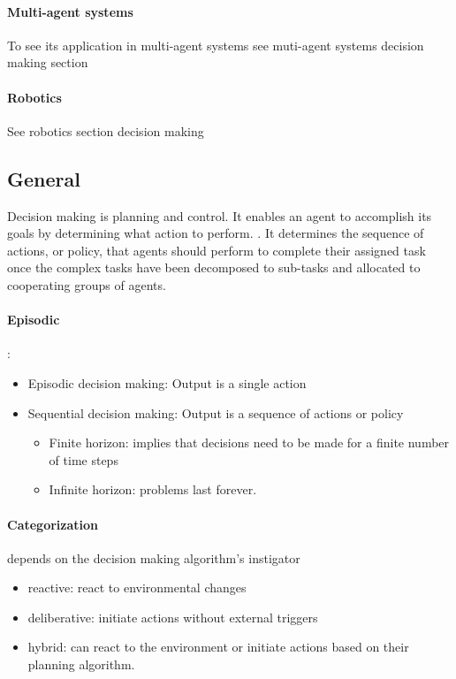 \documentclass{article}
\begin{document}
	 	\paragraph{Multi-agent systems} To see its application in multi-agent systems see muti-agent systems decision making section
	 	\paragraph{Robotics} See robotics section decision making
	 	
	 	\subsection{General}
	 	Decision making is planning and control. It enables an agent to accomplish its goals by determining what action to perform. \cite{rizk-2018-decision-making-in-multiagent-systems-a-survey}.
	 	It determines the sequence of actions, or policy, that agents should perform to complete their assigned task once the complex tasks have been decomposed to sub-tasks and allocated to cooperating groups of agents. 
	 	
	 	\paragraph{Episodic}:
	 	\begin{itemize}
	 		\item Episodic decision making: Output is a single action
	 		\item Sequential decision making: Output is a sequence of actions or policy
	 			\begin{itemize}
	 				\item Finite horizon: implies that decisions need to be made for a finite number of time steps
	 				\item Infinite horizon: problems last forever.
	 			\end{itemize}	
	 	\end{itemize}
	 
 		\paragraph{Categorization} depends on the decision making algorithm’s instigator
	 		\begin{itemize}
	 			\item reactive: react to environmental changes
	 			\item deliberative: initiate actions without external triggers
	 			\item hybrid:  can react to the environment or initiate actions based on their planning algorithm.
 			\end{itemize}
 		
\end{document}
